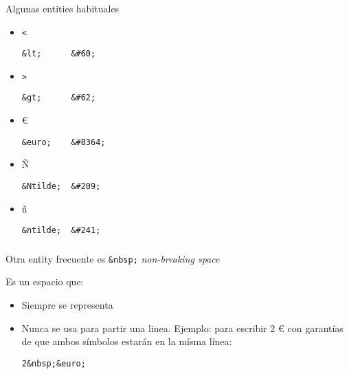 \documentclass[ucs]{beamer}
\begin{document}
\begin{frame}[fragile]
\frametitle{}
Algunas entities habituales
\begin{itemize}
\item
\verb|<|
  \begin{footnotesize}
  \begin{verbatim}
&lt;      &#60;
  \end{verbatim}
  \end{footnotesize}

\item
\verb|>|

  \begin{footnotesize}
  \begin{verbatim}
&gt;      &#62;
  \end{verbatim}
  \end{footnotesize}

\item
€

  \begin{footnotesize}
  \begin{verbatim}
&euro;    &#8364;
  \end{verbatim}
  \end{footnotesize}


\item
Ñ

  \begin{footnotesize}
  \begin{verbatim}
&Ntilde;  &#209;
  \end{verbatim}
  \end{footnotesize}


\item
ñ

  \begin{footnotesize}
  \begin{verbatim}
&ntilde;  &#241;
  \end{verbatim}
  \end{footnotesize}
\end{itemize}

\end{frame}




\begin{frame}[fragile]
\frametitle{}
Otra entity frecuente es
\verb|&nbsp;|
\emph{non-breaking space}

Es un espacio que:
\begin{itemize}
\item
Siempre se representa
\item
Nunca se usa para partir una linea.
Ejemplo: para escribir
2 € 
con garantías de que ambos símbolos estarán en la mísma línea:

\verb|2&nbsp;&euro;|
\end{itemize}

\end{frame}
\end{document}
